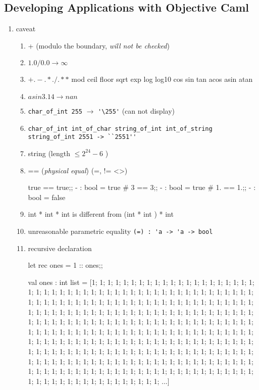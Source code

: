 \subsection{Developing Applications with Objective Caml}

\begin{enumerate}
  \item caveat
    \begin{enumerate}
    \item + (modulo the boundary, \emph{will not be checked})
    \item $1.0/0.0 \rightarrow \infty $
    \item $+. -. *. /. **$  mod ceil floor sqrt exp log log10 cos sin tan acos asin atan  
    \item $asin 3.14  \rightarrow nan    $
    \item \verb|char_of_int 255| $\rightarrow$ \verb|'\255'| (can not display)
    \item \verb|char_of_int int_of_char string_of_int int_of_string|
      \verb|string_of_int 2551 -> ``2551''|
    \item string (length $\le 2^{24} - 6$ )
    \item == (\textit{physical equal}) (=, != <>)


\begin{alternate}
true == true;;
- : bool = true
# 3 == 3;;
- : bool = true
# 1. == 1.;;
- : bool = false
\end{alternate}

    \item int * int * int is different from (int * int ) * int
    \item unreasonable parametric equality \verb|(=) : 'a -> 'a -> bool|
    \item recursive declaration

\begin{redcode}
let rec ones = 1 :: ones;;
\end{redcode}

\begin{bluecode}
val ones : int list =
  [1; 1; 1; 1; 1; 1; 1; 1; 1; 1; 1; 1; 1; 1; 1; 1; 1; 1; 1; 1; 1; 1; 1; 1; 1;
   1; 1; 1; 1; 1; 1; 1; 1; 1; 1; 1; 1; 1; 1; 1; 1; 1; 1; 1; 1; 1; 1; 1; 1; 1;
   1; 1; 1; 1; 1; 1; 1; 1; 1; 1; 1; 1; 1; 1; 1; 1; 1; 1; 1; 1; 1; 1; 1; 1; 1;
   1; 1; 1; 1; 1; 1; 1; 1; 1; 1; 1; 1; 1; 1; 1; 1; 1; 1; 1; 1; 1; 1; 1; 1; 1;
   1; 1; 1; 1; 1; 1; 1; 1; 1; 1; 1; 1; 1; 1; 1; 1; 1; 1; 1; 1; 1; 1; 1; 1; 1;
   1; 1; 1; 1; 1; 1; 1; 1; 1; 1; 1; 1; 1; 1; 1; 1; 1; 1; 1; 1; 1; 1; 1; 1; 1;
   1; 1; 1; 1; 1; 1; 1; 1; 1; 1; 1; 1; 1; 1; 1; 1; 1; 1; 1; 1; 1; 1; 1; 1; 1;
   1; 1; 1; 1; 1; 1; 1; 1; 1; 1; 1; 1; 1; 1; 1; 1; 1; 1; 1; 1; 1; 1; 1; 1; 1;
   1; 1; 1; 1; 1; 1; 1; 1; 1; 1; 1; 1; 1; 1; 1; 1; 1; 1; 1; 1; 1; 1; 1; 1; 1;
   1; 1; 1; 1; 1; 1; 1; 1; 1; 1; 1; 1; 1; 1; 1; 1; 1; 1; 1; 1; 1; 1; 1; 1; 1;
   1; 1; 1; 1; 1; 1; 1; 1; 1; 1; 1; 1; 1; 1; 1; 1; 1; 1; 1; 1; 1; 1; 1; 1; 1;
   1; 1; 1; 1; 1; 1; 1; 1; 1; 1; 1; 1; 1; 1; 1; 1; 1; 1; 1; 1; 1; 1; 1; 1;
   ...]
\end{bluecode}



\end{enumerate}
\end{enumerate}
